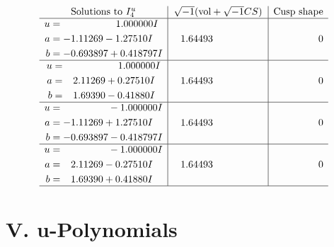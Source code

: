 \documentclass[1p]{elsarticle_modified}
\theoremstyle{definition}
\newcommand{\I}{\sqrt{-1}}
\begin{document}
$$\begin{array}{c|c|c}  
\text{Solutions to }I^u_{4}& \I (\text{vol} + \sqrt{-1}CS) & \text{Cusp shape}\\
 \hline 
\begin{aligned}
u &= \phantom{-0.000000 -}1.000000 I \\
a &= -1.11269 - 1.27510 I \\
b &= -0.693897 + 0.418797 I\end{aligned}
 & \phantom{-}1.64493\phantom{ +0.000000I} & \phantom{-0.000000 } 0 \\ \hline\begin{aligned}
u &= \phantom{-0.000000 -}1.000000 I \\
a &= \phantom{-}2.11269 + 0.27510 I \\
b &= \phantom{-}1.69390 - 0.41880 I\end{aligned}
 & \phantom{-}1.64493\phantom{ +0.000000I} & \phantom{-0.000000 } 0 \\ \hline\begin{aligned}
u &= \phantom{-0.000000 } -1.000000 I \\
a &= -1.11269 + 1.27510 I \\
b &= -0.693897 - 0.418797 I\end{aligned}
 & \phantom{-}1.64493\phantom{ +0.000000I} & \phantom{-0.000000 } 0 \\ \hline\begin{aligned}
u &= \phantom{-0.000000 } -1.000000 I \\
a &= \phantom{-}2.11269 - 0.27510 I \\
b &= \phantom{-}1.69390 + 0.41880 I\end{aligned}
 & \phantom{-}1.64493\phantom{ +0.000000I} & \phantom{-0.000000 } 0\\
 \hline 
 \end{array}$$\newpage
\newpage\renewcommand{\arraystretch}{1}
\centering \section*{ V. u-Polynomials}
\end{document}
